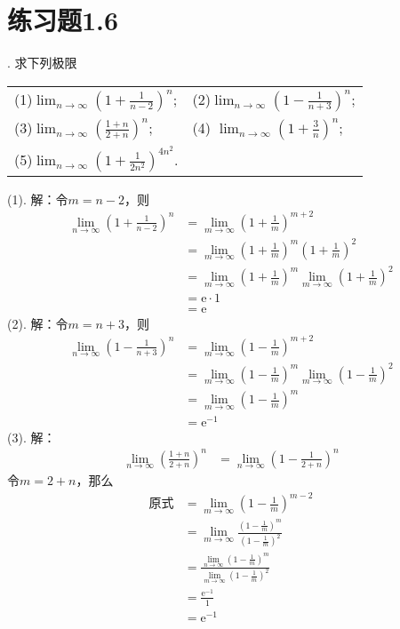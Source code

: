 \documentclass{ctexart}
\theoremstyle{definition}
\theoremstyle{definition}
\theoremstyle{plain}
\theoremstyle{plain}
\theoremstyle{plain}
\theoremstyle{definition}
\begin{document}
\section*{练习题1.6}
. 求下列极限
\begin{table}[H]
    \centering
    \begin{tabularx}{0.8\textwidth} {  >{\raggedright\arraybackslash}X >{\raggedright\arraybackslash}X  }
       (1)$\displaystyle \lim_{n\to\infty} \left(1+\frac{1}{n-2}\right)^n$; &  (2)$\displaystyle \lim_{n \to \infty} \left(1-\frac{1}{n+3}\right)^n$; \\ [1.5em]
       (3)$\displaystyle \lim_{n \to \infty} \left(\frac{1+n}{2+n}\right)^n$; & (4) $\displaystyle \lim_{n \to \infty} \left(1+\frac{3}{n}\right)^n$; \\ [1.5em]
       (5)$\displaystyle \lim_{n \to \infty} \left(1+\frac{1}{2n^2}\right)^{4n^2}$.
      \end{tabularx}
\end{table}
\noindent (1). 解：令$m = n-2$，则
\begin{align}
    \lim_{n \to \infty} \left(1+\frac{1}{n-2}\right)^n &= \lim_{m \to \infty} \left(1+ \frac{1}{m}\right)^{m+2} \\
    &= \lim_{m \to \infty} \left(1+\frac{1}{m}\right)^m \left(1+\frac{1}{m}\right)^2 \\
    &= \lim_{m \to \infty} \left(1+\frac{1}{m}\right)^m \lim_{m \to \infty} \left(1+\frac{1}{m}\right)^2 \\
    &= \mathrm{e} \cdot 1 \\
    &= \mathrm{e}
\end{align}
\noindent (2). 解：令$m=n+3$，则
\begin{align}
    \lim_{n \to \infty} \left(1-\frac{1}{n+3}\right)^n &= \lim_{m \to \infty} \left(1-\frac{1}{m}\right)^{m+2} \\
    &= \lim_{m \to \infty} \left(1-\frac{1}{m}\right)^m \lim_{m \to \infty} \left(1-\frac{1}{m}\right)^2 \\
    &= \lim_{m \to \infty} \left(1-\frac{1}{m}\right)^m \\
    &= \mathrm{e}^{-1}
\end{align}
\noindent (3). 解：
\begin{align}
    \lim_{n \to \infty} \left(\frac{1+n}{2+n}\right)^n &= \lim_{n \to \infty} \left(1 - \frac{1}{2+n}\right)^n
\end{align}
令$m = 2+n$，那么
\begin{align}
    \text{原式} &= \lim_{m \to \infty} \left(1-\frac{1}{m}\right)^{m-2} \\
    &= \lim_{m\to\infty} \frac{\left(1-\frac{1}{m}\right)^m}{\left(1-\frac{1}{m}\right)^2} \\
    &= \frac{\displaystyle\lim_{n \to \infty}\left(1-\frac{1}{m}\right)^m}{\displaystyle\lim_{m\to\infty} \left(1-\frac{1}{m}\right)^2} \\
    &= \frac{\mathrm{e}^{-1}}{1} \\
    &= \mathrm{e}^{-1}
\end{align}
\end{document}
